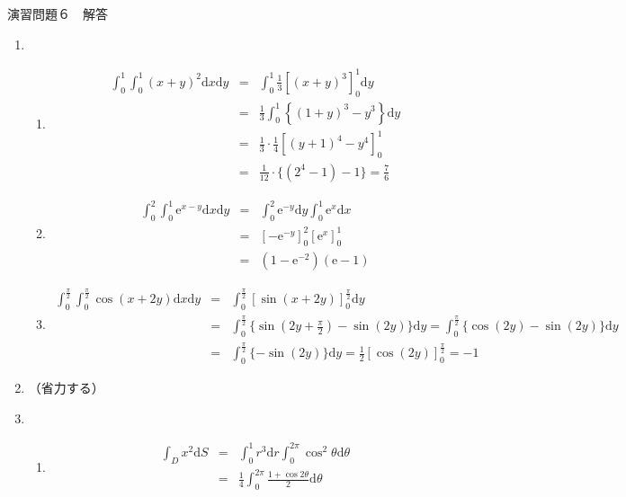 \documentclass{jarticle}
\newcommand{\e}[1]{\tilde E^{({#1})}}
\def\d{\mathrm d}
\def\e{\mathrm{e}}
\begin{document}
\begin{center} {\Large 演習問題６　解答} \end{center}
  \begin{enumerate}
    \item
    \begin{enumerate}
      \item
        \begin{eqnarray*} 
          \int_0^1 \int_0^1 (x+y)^2 \d x \d y & = & \int_0^1 \frac{1}{3} \left[(x+y)^3 \right]_0^1 \d y \\
          & = & \frac{1}{3} \int_0^1 \left\{ (1+y)^3 - y^3 \right\} \d y \\
          & = & \frac{1}{3} \cdot \frac{1}{4} \left[ (y+1)^4 - y^4 \right]_0^1 \\
          & = & \frac{1}{12} \cdot \{ (2^4-1)-1 \} = \frac{7}{6}
        \end{eqnarray*}
      \item
        \begin{eqnarray*}
          \int_0^2 \int_0^1 \e^{x-y} \d x \d y & = & \int_0^2 \e^{-y} \d y \int_0^1 \e^{x} \d x \\
          & = & \left[ - \e^{-y} \right]_0^2 \left[ \e^{x} \right]_0^1 \\
          & = & (1 - \e^{-2} )(\e -1 )
        \end{eqnarray*}
      \item
        \begin{eqnarray*}
          \int_0^{\frac{\pi}{2}} \int_0^{\frac{\pi}{2}} \cos(x+2y) \d x \d y & = & \int_0^{\frac{\pi}{2}} \left[ \sin(x+2y) \right]_0^{\frac{\pi}{2}} \d y \\
          & = & \int_0^{\frac{\pi}{2}} \{ \sin(2y+\frac{\pi}{2}) - \sin(2y) \} \d y =  \int_0^{\frac{\pi}{2}} \{ \cos(2y) - \sin(2y) \} \d y \\
          & = & \int_0^{\frac{\pi}{2}} \{ - \sin(2y) \} \d y = \frac{1}{2} \left[ \cos(2y) \right]_0^{\frac{\pi}{2}} = -1
        \end{eqnarray*}
    \end{enumerate}
    \item （省力する）
    \item
      \begin{enumerate}
        \item
          \begin{eqnarray*}
            \int_{D} x^2 \d S & = & \int_0^1 r^3 \d r \int_0^{2\pi} \cos^2 \theta \d \theta \\
            & = & \frac{1}{4} \int_0^{2\pi} \frac{1+\cos{2\theta}}{2} \d \theta \\

\end{eqnarray*}
\end{enumerate}
\end{enumerate}
\end{document}
